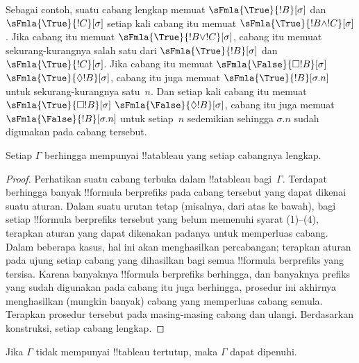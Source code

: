 \documentclass[../../../include/open-logic-section]{subfiles}
\begin{document}
\begin{explain}
Sebagai contoh, suatu cabang lengkap memuat
$\sFmla{\True}{!B}[\sigma]$ dan $\sFmla{\True}{!C}[\sigma]$ setiap kali
cabang itu memuat $\sFmla{\True}{!B \land !C}[\sigma]$. Jika cabang itu
memuat $\sFmla{\True}{!B \lor !C}[\sigma]$, cabang itu memuat sekurang-kurangnya
salah satu dari $\sFmla{\True}{!B}[\sigma]$ dan
$\sFmla{\True}{!C}[\sigma]$. Jika cabang itu memuat 
{$\sFmla{\False}{\Box !B}[\sigma]$}
{$\sFmla{\True}{\Diamond !B}[\sigma]$}, cabang itu juga memuat
{$\sFmla{\True}{!B}[\sigma.n]$} untuk sekurang-kurangnya satu~$n$. Dan
setiap kali cabang itu memuat 
{$\sFmla{\True}{\Box !B}[\sigma]$}
{$\sFmla{\False}{\Diamond !B}[\sigma]$}, cabang itu juga memuat
{$\sFmla{\False}{!B}[\sigma.n]$} untuk setiap~$n$ sedemikian sehingga
$\sigma.n$ sudah digunakan pada cabang tersebut.
\end{explain}

\begin{prop}
  Setiap $\Gamma$ berhingga mempunyai !!a{tableau} yang setiap cabangnya
  lengkap.
\end{prop}

\begin{proof}
  Perhatikan suatu cabang terbuka dalam !!a{tableau} bagi~$\Gamma$. Terdapat
  berhingga banyak !!{formula} berprefiks pada cabang tersebut yang dapat
  dikenai suatu aturan. Dalam suatu urutan tetap (misalnya, dari atas ke
  bawah), bagi setiap !!{formula} berprefiks tersebut yang belum memenuhi
  syarat (1)--(4), terapkan aturan yang dapat dikenakan padanya untuk
  memperluas cabang. Dalam beberapa kasus, hal ini akan menghasilkan
  percabangan; terapkan aturan pada ujung setiap cabang yang dihasilkan bagi
  semua !!{formula} berprefiks yang tersisa. Karena banyaknya !!{formula}
  berprefiks berhingga, dan banyaknya prefiks yang sudah digunakan pada
  cabang itu juga berhingga, prosedur ini akhirnya menghasilkan (mungkin
  banyak) cabang yang memperluas cabang semula. Terapkan prosedur tersebut
  pada masing-masing cabang dan ulangi. Berdasarkan konstruksi, setiap cabang
  lengkap.
\end{proof}

\begin{thm}[Kelengkapan]
  Jika $\Gamma$ tidak mempunyai !!{tableau} tertutup, maka $\Gamma$ dapat
  dipenuhi.
\end{thm}
\end{document}
